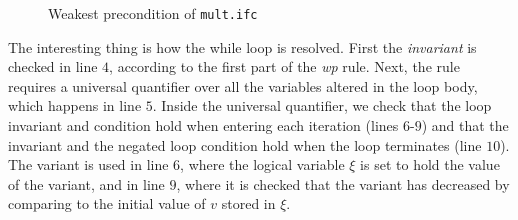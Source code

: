 \begin{figure}[h!]

\caption{Weakest precondition of \texttt{mult.ifc}}
\label{figure:wpmult}
\end{figure}

The interesting thing is how the while loop is resolved. First the \textit{invariant} is checked in line $4$, according to the first part of the \textit{wp} rule.
Next, the rule requires a universal quantifier over all the variables altered in the loop body, which happens in line $5$.
Inside the universal quantifier, we check that the loop invariant and condition hold when entering each iteration (lines $6$-$9$) and that the invariant and the negated loop condition hold when the loop terminates (line $10$).
The variant is used in line $6$, where the logical variable $\xi$ is set to hold the value of the variant, and in line $9$, where it is checked that the variant has decreased by comparing to the initial value of $v$ stored in $\xi$.
